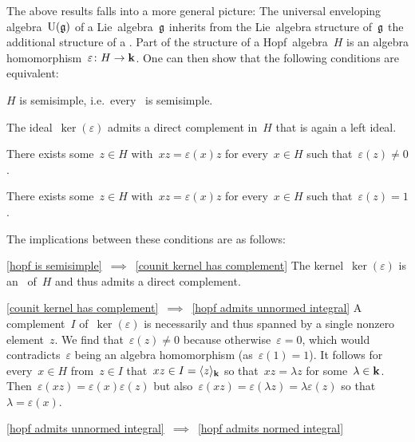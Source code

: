 \begin{remark}
  The above results falls into a more general picture:
  The universal enveloping algebra~$\operatorname{U}(\mathfrak{g})$ of a Lie~algebra~$\mathfrak{g}$ inherits from the Lie~algebra structure of~$\mathfrak{g}$ the additional structure of a .
  Part of the structure of a Hopf~algebra~$H$ is an algebra homomorphism~$\varepsilon \colon H \to \mathbf{k}$.
  One can then show that the following conditions are equivalent:
  \begin{equivalenceslist}
    \item
      \label{hopf is semisimple}
      $H$ is semisimple, i.e.~every~{} is semisimple.
    \item
      \label{counit kernel has complement}
      The ideal~$\ker(\varepsilon)$ admits a direct complement in~$H$ that is again a left ideal.
    \item
      \label{hopf admits unnormed integral}
      There exists some~$z \in H$ with~$xz = \varepsilon(x)z$ for every~$x \in H$ such that~$\varepsilon(z) \neq 0$.
    \item
      \label{hopf admits normed integral}
      There exists some~$z \in H$ with~$xz = \varepsilon(x)z$ for every~$x \in H$ such that~$\varepsilon(z) = 1$.
  \end{equivalenceslist}
  The implications between these conditions are as follows:
  \begin{implicationlist}
    \item[\ref*{hopf is semisimple}~$\implies$~\ref*{counit kernel has complement}]
      The kernel~$\ker(\varepsilon)$ is an~{} of~$H$ and thus admits a direct complement.
    \item[\ref*{counit kernel has complement}~$\implies$~\ref*{hopf admits unnormed integral}]
      A complement~$I$ of~$\ker(\varepsilon)$ is necessarily {\onedimensional} and thus spanned by a single nonzero element~$z$.
      We find that~$\varepsilon(z) \neq 0$ because otherwise~$\varepsilon = 0$, which would contradicts~$\varepsilon$ being an algebra homomorphism (as~$\varepsilon(1) = 1$).
      It follows for every~$x \in H$ from~$z \in I$ that~$xz \in I = \langle z\rangle_{\mathbf{k}}$ so that~$xz = \lambda z$ for some~$\lambda \in \mathbf{k}$.
      Then~$\varepsilon(xz) = \varepsilon(x)\varepsilon(z)$ but also~$\varepsilon(xz) = \varepsilon(\lambda z) = \lambda \varepsilon(z)$ so that~$\lambda = \varepsilon(x)$.
    \item[\ref*{hopf admits unnormed integral}~$\implies$~\ref*{hopf admits normed integral}]

\end{implicationlist}
\end{remark}
